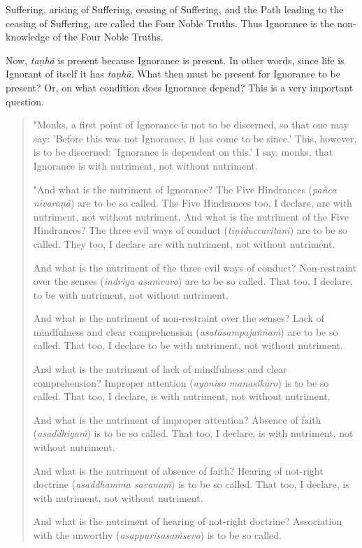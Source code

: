 Suffering, arising of Suffering, ceasing of Suffering, and the Path leading to the ceasing of Suffering, are called the Four Noble Truths. Thus Ignorance is the non-knowledge of the Four Noble Truths.

Now, \emph{taṇhā} is present because Ignorance is present. In other words, since life is Ignorant of itself it has \emph{taṇhā}. What then must be present for Ignorance to be present? Or, on what condition does Ignorance depend? This is a very important question.

\begin{quote}
"Monks, a first point of Ignorance is not to be discerned, so that one may say: 'Before this was not Ignorance, it has come to be since.' This, however, is to be discerned: 'Ignorance is dependent on this.' I say, monks, that Ignorance is with nutriment, not without nutriment.

"And what is the nutriment of Ignorance? The Five Hindrances (\emph{pañca nīvaraṇā}) are to be so called. The Five Hindrances too, I declare, are with nutriment, not without nutriment. And what is the nutriment of the Five Hindrances? The three evil ways of conduct (\emph{tīṇiduccaritāni}) are to be so called. They too, I declare are with nutriment, not without nutriment.

And what is the nutriment of the three evil ways of conduct? Non-restraint over the senses (\emph{indriya asaṁvaro}) are to be so called. That too, I declare, to be with nutriment, not without nutriment.

And what is the nutriment of non-restraint over the senses? Lack of mindfulness and clear comprehension (\emph{asatāsampajaññaṁ}) are to be so called. That too, I declare to be with nutriment, not without nutriment.

And what is the nutriment of lack of mindfulness and clear comprehension? Improper attention (\emph{ayoniso manasikāro}) is to be so called. That too, I declare, is with nutriment, not without nutriment.

And what is the nutriment of improper attention? Absence of faith (\emph{asaddhiyaṁ}) is to be so called. That too, I declare, is with nutriment, not without nutriment.

And what is the nutriment of absence of faith? Hearing of not-right doctrine (\emph{asaddhamma savanaṁ}) is to be so called. That too, I declare, is with nutriment, not without nutriment.

And what is the nutriment of hearing of not-right doctrine? Association with the unworthy (\emph{asappurisasaṁsevo}) is to be so called.


\end{quote}
